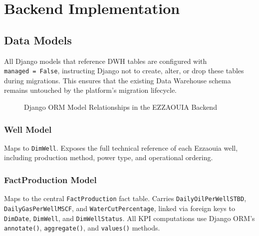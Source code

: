 \section{Backend Implementation}
\begin{sloppypar}

\subsection{Data Models}

All Django models that reference DWH tables are configured with
\texttt{managed~=~False}, instructing Django not to create, alter, or drop these
tables during migrations. This ensures that the existing Data Warehouse schema
remains untouched by the platform's migration lifecycle.

\begin{figure}[H]
    \centering
    \caption{Django ORM Model Relationships in the EZZAOUIA Backend}
    \label{fig:django_models}
\end{figure}

\subsubsection{Well Model}

Maps to \texttt{DimWell}. Exposes the full technical reference of each Ezzaouia
well, including production method, power type, and operational ordering.

\subsubsection{FactProduction Model}

Maps to the central \texttt{FactProduction} fact table. Carries
\texttt{DailyOilPerWellSTBD}, \texttt{DailyGasPerWellMSCF}, and
\texttt{WaterCutPercentage}, linked via foreign keys to \texttt{DimDate},
\texttt{DimWell}, and \texttt{DimWellStatus}. All KPI computations use
Django ORM's \texttt{annotate()}, \texttt{aggregate()}, and
\texttt{values()} methods.


\end{sloppypar}
